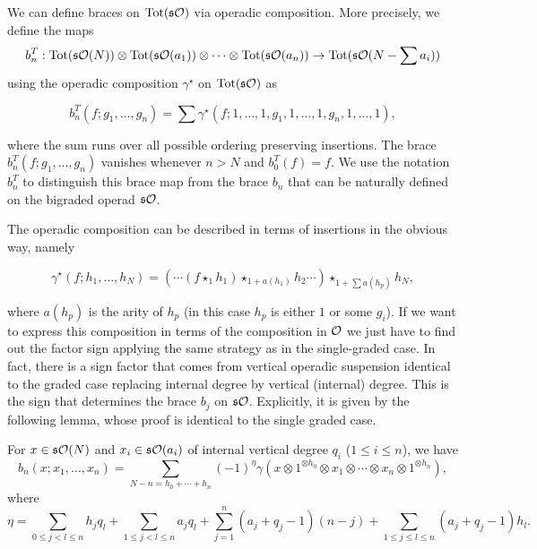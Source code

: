 \documentclass[join.tex]{subfiles}
\begin{document}

We can define braces on $\mathrm{Tot}(\mathfrak{s}{\mathcal O})$ via operadic composition. More precisely, we define the maps 
\[b^T_n:\mathrm{Tot}(\mathfrak{s}{\mathcal O}(N))\otimes \mathrm{Tot}(\mathfrak{s}{\mathcal O}(a_1))\otimes\cdots\otimes \mathrm{Tot}(\mathfrak{s}{\mathcal O}(a_n))\to \mathrm{Tot}(\mathfrak{s}{\mathcal O}(N-\sum a_i))\]
using the operadic composition $\gamma^\star$ on $\mathrm{Tot}(\mathfrak{s}{\mathcal O})$ as

\[b^T_n(f;g_1,\dots,g_n)=\sum\gamma^\star(f;1,\dots,1,g_1,1,\dots,1,g_n,1,\dots,1),\]

where the sum runs over all possible ordering preserving insertions. The brace $b^T_n(f;g_1,\dots,g_n)$ vanishes whenever $n>N$ and $b^T_0(f)=f$. We use the notation $b^T_n$ to distinguish this brace map from the brace $b_n$ that can be naturally defined on the bigraded operad $\mathfrak{s}{\mathcal O}$.

The operadic composition can be described in terms of insertions in the obvious way, namely 

\begin{equation}\label{gammastar}
\gamma^\star(f;h_1,\dots, h_N)=(\cdots(f\star_1 h_1)\star_{1+a(h_1)}h_2\cdots)\star_{1+\sum a(h_p)}h_N,
\end{equation}

where $a(h_p)$ is the arity of $h_p$ (in this case $h_p$ is either $1$ or some $g_i$). If we want to express this composition in terms of the composition in ${\mathcal O}$ we just have to find out the factor sign applying the same strategy as in the single-graded case. In fact, there is a sign factor that comes from vertical operadic suspension identical to the graded case replacing internal degree by vertical (internal) degree. This is the sign that determines the brace $b_j$ on $\mathfrak{s}{\mathcal O}$. Explicitly, it is given by the following lemma, whose proof is identical to the single graded case.


 
 \begin{lem}\label{bigradedsign}
For $x\in \mathfrak{s}{\mathcal O}(N)$ and $x_i\in\mathfrak{s}{\mathcal O}(a_i)$ of internal vertical degree $q_i$ ($1\leq i\leq n$), we have
\[b_n(x;x_1,\dots,x_n)=\sum_{N-n=h_0+\cdots+h_n} (-1)^\eta \gamma
(x\otimes 1^{\otimes h_0}\otimes x_1\otimes \cdots\otimes x_n\otimes1^{\otimes h_n}),\]
where 
\[\eta=\sum_{0\leq j<l\leq n}h_jq_l+\sum_{1\leq j<l\leq n}a_jq_l+\sum_{j=1}^n (a_j+q_j-1)(n-j)+\sum_{1\leq j\leq l\leq n} (a_j+q_j-1)h_l.\]
\end{lem}
\end{document}
